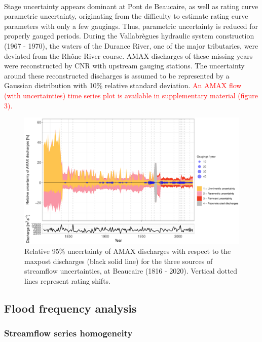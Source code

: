 \documentclass[11pt]{article}
\begin{document}
    \paragraph{} Stage uncertainty appears dominant at Pont de Beaucaire, as well as rating curve parametric uncertainty, originating from the difficulty to estimate rating curve parameters with only a few gaugings. Thus, parametric uncertainty is reduced for properly gauged periods. During the Vallabrègues hydraulic system construction (1967 - 1970), the waters of the Durance River, one of the major tributaries, were deviated from the Rhône River course. AMAX discharges of these missing years were reconstructed by CNR with upstream gauging stations. The uncertainty around these reconstructed discharges is assumed to be represented by a Gaussian distribution with 10\% relative standard deviation. \textcolor{red}{An AMAX flow (with uncertainties) time series plot is available in supplementary material (figure 3).}
    
    
    \begin{figure}[h!]
        \centering
        \includegraphics[width=\textwidth]{Figs/9-IcAndAMAX.pdf}
        \caption{Relative 95\% uncertainty of AMAX discharges with respect to the maxpost discharges (black solid line) for the three sources of streamflow uncertainties, at Beaucaire (1816 - 2020). Vertical dotted lines represent rating shifts.}
        \label{fig:ICtot_both}
    \end{figure}
    \FloatBarrier
   
    \subsection{Flood frequency analysis}
    
        \subsubsection{Streamflow series homogeneity}
           
\end{document}
